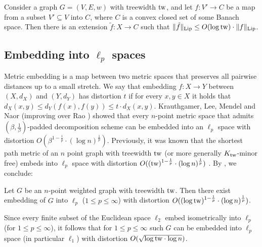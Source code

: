 \documentclass{article}
\newcommand{\tw}{{\rm tw}}
\newcommand{\Lip}{{\rm Lip}}
\begin{document}
\begin{corollary}\label{thm:LipschitzExtension}
	Consider a graph $G=(V,E,w)$ with treewidth $\tw$, and let $f:V'\rightarrow C$ be a map from a subset $V'\subseteq V$ into $C$, where $C$ is a convex closed set of some Banach space.
	Then there is an extension $\tilde{f}:X\rightarrow C$ such that $\|\tilde{f}\|_{\Lip}\le O(\log\tw)\cdot \|f\|_{\Lip}$.
\end{corollary}


\subsection{Embedding into \texorpdfstring{$\ell_p$}{lp} spaces}
Metric embedding is a map between two metric spaces that preserves all pairwise distances up to a small stretch. We say that embedding $f:X\rightarrow Y$ between $(X,d_X)$ and $(Y,d_Y)$ has distortion $t$ if for every $x,y\in X$ it holds that $d_X(x,y)\le d_Y(f(x),f(y))\le t\cdot d_X(x,y)$. Krauthgamer, Lee, Mendel and Naor \cite{KLMN04} (improving over Rao \cite{Rao99}) showed that every $n$-point metric space that admits $(\beta,\frac1\beta)$-padded decomposition scheme can be embedded into an $\ell_p$ space with distortion $O(\beta^{1-\frac1p}\cdot(\log n)^{\frac1p})$.
Previously, it was known that the shortest path metric of an $n$ point graph with treewidth $\tw$ (or more generally $K_{\tw}$-minor free) embeds into $\ell_p$ space with distortion $O((\tw)^{1-\frac1p}\cdot(\log n)^{\frac1p})$ \cite{KLMN04,AGGNT19}.
By , we conclude:

\begin{corollary}\label{cor:EmbeddingLp}
	Let $G$ be an $n$-point weighted graph with treewidth $\tw$. Then there exist embedding of $G$ into $\ell_p$ ($1\le p\le\infty$) with distortion $O((\log \tw)^{1-\frac1p}\cdot(\log n)^{\frac1p})$.
\end{corollary}
Since every finite subset of the Euclidean space $\ell_2$ embed isometrically into $\ell_p$ (for $1\le p\le\infty$), it follows that for $1\le p\le\infty$ such $G$ can be embedded into $\ell_p$ space (in particular $\ell_1$) with distortion $O(\sqrt{\log \tw\cdot \log n})$.
\end{document}
